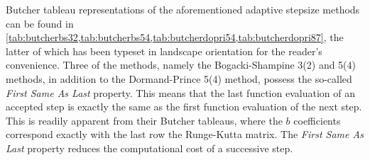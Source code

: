 Butcher tableau representations of the aforementioned adaptive stepsize methods
can be found in
\cref{tab:butcherbs32,tab:butcherbs54,tab:butcherdopri54,tab:butcherdopri87},
the latter of which has been typeset in landscape orientation for the reader's
convenience. Three of the methods, namely the Bogacki-Shampine 3(2) and 5(4)
methods, in addition to the Dormand-Prince 5(4) method, possess the so-called
\emph{First Same As Last} property. This means that the last function evaluation
of an accepted step is exactly the same as the first function evaluation of the
next step. This is readily apparent from their Butcher tableaus, where the
$b$ coefficients correspond exactly with the last row the Runge-Kutta matrix.
The \emph{First Same As Last} property reduces the computational
cost of a successive step.



\vfill{}









